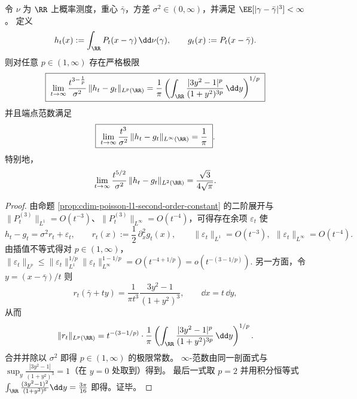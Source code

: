 \begin{theorem}\label{thm:cdim-poisson-cauchy-lp-sharp-constants}
令 \(\nu\) 为 \(\RR\) 上概率测度，重心 \(\bar\gamma\)，方差 \(\sigma^2\in(0,\infty)\)，并满足 \(\EE[|\gamma-\bar\gamma|^3]<\infty\)。
定义
\[
h_t(x):=\int_{\RR}P_t(x-\gamma)\,\dd\nu(\gamma),
\qquad
g_t(x):=P_t(x-\bar\gamma).
\]
则对任意 \(p\in(1,\infty)\) 存在严格极限
\[
\boxed{\;
\lim_{t\to\infty}\frac{t^{3-\frac1p}}{\sigma^2}\,\|h_t-g_t\|_{L^p(\RR)}
=
\frac1\pi\left(\int_{\RR}\frac{|3y^2-1|^p}{(1+y^2)^{3p}}\,\dd y\right)^{1/p}\;}
\]
并且端点范数满足
\[
\boxed{\;
\lim_{t\to\infty}\frac{t^{3}}{\sigma^2}\,\|h_t-g_t\|_{L^\infty(\RR)}=\frac1\pi\; }.
\]
特别地，
\[
\lim_{t\to\infty}\frac{t^{5/2}}{\sigma^2}\,\|h_t-g_t\|_{L^2(\RR)}=\frac{\sqrt3}{4\sqrt\pi}.
\]
\end{theorem}
\begin{proof}
由命题 \ref{prop:cdim-poisson-l1-second-order-constant} 的二阶展开与
\(\|P_t^{(3)}\|_{L^1}=O(t^{-3})\)、\(\|P_t^{(3)}\|_{L^\infty}=O(t^{-4})\)，可得存在余项 \(\varepsilon_t\) 使
\[
h_t-g_t=\sigma^2 r_t+\varepsilon_t,
\qquad
r_t(x):=\frac12\,\partial_x^2 g_t(x),
\qquad
\|\varepsilon_t\|_{L^1}=O(t^{-3}),\ \ \|\varepsilon_t\|_{L^\infty}=O(t^{-4}).
\]
由插值不等式得对 \(p\in(1,\infty)\)，
\(
\|\varepsilon_t\|_{L^p}\le \|\varepsilon_t\|_{L^1}^{1/p}\|\varepsilon_t\|_{L^\infty}^{1-1/p}
=O(t^{-4+1/p})
=o(t^{-(3-1/p)}).
\)
另一方面，令 \(y=(x-\bar\gamma)/t\) 则
\[
r_t(\bar\gamma+ty)=\frac1{\pi t^3}\frac{3y^2-1}{(1+y^2)^3},
\qquad
\dd x=t\,\dd y,
\]
从而
\[
\|r_t\|_{L^p(\RR)}
=t^{-(3-1/p)}\cdot \frac1\pi\left(\int_{\RR}\frac{|3y^2-1|^p}{(1+y^2)^{3p}}\,\dd y\right)^{1/p}.
\]
合并并除以 \(\sigma^2\) 即得 \(p\in(1,\infty)\) 的极限常数。
\(\infty\)-范数由同一剖面式与 \(\sup_{y}\frac{|3y^2-1|}{(1+y^2)^3}=1\)（在 \(y=0\) 处取到）得到。
最后一式取 \(p=2\) 并用积分恒等式
\(
\int_{\RR}\frac{(3y^2-1)^2}{(1+y^2)^6}\dd y=\frac{3\pi}{16}
\)
即得。证毕。
\end{proof}

